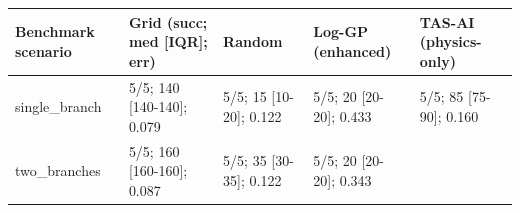 \documentclass[
]{article}
\begin{document}
\begin{longtable}[]{@{}lllll@{}}
\toprule
\begin{minipage}[b]{0.18\columnwidth}\raggedright
\textbf{Benchmark scenario}\strut
\end{minipage} & \begin{minipage}[b]{0.21\columnwidth}\raggedright
\textbf{Grid (succ; med {[}IQR{]}; err)}\strut
\end{minipage} & \begin{minipage}[b]{0.15\columnwidth}\raggedright
\textbf{Random}\strut
\end{minipage} & \begin{minipage}[b]{0.15\columnwidth}\raggedright
\textbf{Log-GP (enhanced)}\strut
\end{minipage} & \begin{minipage}[b]{0.17\columnwidth}\raggedright
\textbf{TAS-AI (physics-only)}\strut
\end{minipage}\tabularnewline
\midrule
\endhead
\begin{minipage}[t]{0.18\columnwidth}\raggedright
single\_branch\strut
\end{minipage} & \begin{minipage}[t]{0.21\columnwidth}\raggedright
5/5; 140 {[}140-140{]}; 0.079\strut
\end{minipage} & \begin{minipage}[t]{0.15\columnwidth}\raggedright
5/5; 15 {[}10-20{]}; 0.122\strut
\end{minipage} & \begin{minipage}[t]{0.15\columnwidth}\raggedright
5/5; 20 {[}20-20{]}; 0.433\strut
\end{minipage} & \begin{minipage}[t]{0.17\columnwidth}\raggedright
5/5; 85 {[}75-90{]}; 0.160\strut
\end{minipage}\tabularnewline
\begin{minipage}[t]{0.18\columnwidth}\raggedright
two\_branches\strut
\end{minipage} & \begin{minipage}[t]{0.21\columnwidth}\raggedright
5/5; 160 {[}160-160{]}; 0.087\strut
\end{minipage} & \begin{minipage}[t]{0.15\columnwidth}\raggedright
5/5; 35 {[}30-35{]}; 0.122\strut
\end{minipage} & \begin{minipage}[t]{0.15\columnwidth}\raggedright
5/5; 20 {[}20-20{]}; 0.343\strut
\end{minipage} & \begin{minipage}[t]{0.17\columnwidth}\raggedright

\end{minipage}
\end{longtable}
\end{document}
